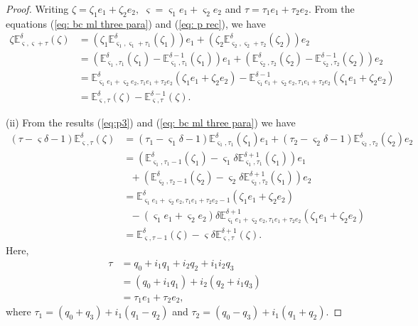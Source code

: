 \documentclass[a4paper,12pt]{article}
\theoremstyle{remark}
\begin{document}
\begin{proof}
Writing $\zeta=\zeta_1 e_1+\zeta_2e_2,$  $ \varsigma= \varsigma_1e_1+ \varsigma_2 e_2$ and $ \tau=\tau_1e_1+\tau_2e_2.$
From the equations (\ref{eq: bc ml three para}) and (\ref{eq: p rec}), we have 
	\begin{equation}
	\begin{split}
		\zeta\mathbb{E}^\delta_{ \varsigma, \varsigma+\tau}(\zeta)&=\left( \zeta_1\mathbb{E}^\delta_{ \varsigma_1, \varsigma_1+\tau_1}(\zeta_1)\right) e_1+\left( \zeta_2\mathbb{E}^\delta_{ \varsigma_2, \varsigma_2+\tau_2}(\zeta_2)\right) e_2\\
	&=\left( \mathbb{E}^\delta_{ \varsigma_1,\tau_1}(\zeta_1)-\mathbb{E}^{\delta-1}_{ \varsigma_1,\tau_1}(\zeta_1)\right)e_1 +\left( \mathbb{E}^\delta_{ \varsigma_2,\tau_2}(\zeta_2)-\mathbb{E}^{\delta-1}_{ \varsigma_2,\tau_2}(\zeta_2)\right)e_2\\
	&=\mathbb{E}^\delta_{ \varsigma_1e_1+ \varsigma_2e_2,\tau_1e_1+\tau_2e_2}(\zeta_1e_1+\zeta_2e_2)-\mathbb{E}^{\delta-1}_{ \varsigma_1e_1+ \varsigma_2e_2,\tau_1e_1+\tau_2e_2}(\zeta_1e_1+\zeta_2e_2)\\
		&=\mathbb{E}^\delta_{ \varsigma,\tau}(\zeta)-\mathbb{E}^{\delta-1}_{ \varsigma,\tau}(\zeta).
		\end{split}
	\end{equation}

\noindent (ii) From the results (\ref{eq:p3}) and (\ref{eq: bc ml three para}) we have 
	\begin{equation}
	\begin{split}
	(\tau- \varsigma\delta-1)\mathbb{E}^{\delta}_{ \varsigma,\tau}(\zeta)&=(\tau_1- \varsigma_1\delta-1)\mathbb{E}^{\delta}_{ \varsigma_1,\tau_1}(\zeta_1)e_1+(\tau_2- \varsigma_2\delta-1)\mathbb{E}^{\delta}_{ \varsigma_2,\tau_2}(\zeta_2)e_2\\
&=\left(\mathbb{E}^{\delta}_{ \varsigma_1,\tau_1-1}(\zeta_1)- \varsigma_1\delta\mathbb{E}^{\delta+1}_{ \varsigma_1,\tau_1}(\zeta_1)\right) e_1	\\
&~~~+\left(\mathbb{E}^{\delta}_{ \varsigma_2,\tau_2-1}(\zeta_2)- \varsigma_2\delta\mathbb{E}^{\delta+1}_{ \varsigma_2,\tau_2}(\zeta_1)\right) e_2	\\
&=\mathbb{E}^{\delta}_{ \varsigma_1e_1+ \varsigma_2e_2,\tau_1e_1+\tau_2e_2-1}(\zeta_1e_1+\zeta_2e_2)\\
&~~~-( \varsigma_1e_1+ \varsigma_2e_2)\delta\mathbb{E}^{\delta+1}_{ \varsigma_1e_1+ \varsigma_2e_2,\tau_1e_1+\tau_2e_2}(\zeta_1e_1+\zeta_2e_2)	\\
&=\mathbb{E}^{\delta}_{ \varsigma,\tau-1}(\zeta)- \varsigma\delta\mathbb{E}^{\delta+1}_{ \varsigma,\tau}(\zeta).
\end{split}
\end{equation}
Here,
\begin{equation}
		\begin{split}
		\tau&= q_0+i_1q_1+ i_2q_2+i_1i_2q_3\\
		&=(q_0+i_1q_1) +i_2( q_2+i_1q_3)\\
		&=\tau_1e_1+\tau_2e_2,
		\end{split}
		\end{equation}
		where $\tau_1= (q_0+q_3) +i_1(q_1-q_2)$ and $\tau_2= (q_0-q_3) +i_1(q_1+q_2).$
		

\end{proof}
\end{document}
